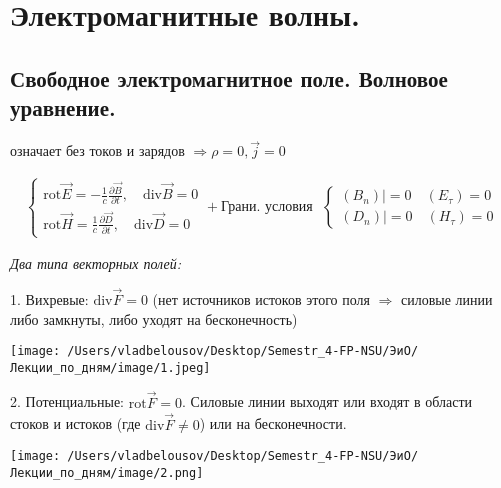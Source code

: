 \documentclass[12pt, a4paper]{report}
\begin{document}
\fi


\chapter{Электромагнитные волны.}

\section{Свободное электромагнитное поле. Волновое уравнение.  }

\begin{definition}[Свободное]   
означает без токов и зарядов \( \Rightarrow \rho =0 , \vec{j}= 0   \) 
\end{definition}

\[ 
\begin{aligned}
    \begin{cases}
         \displaystyle \mathrm{rot} \vec{ E} =-\frac{1}{c}\frac{\partial\vec{B}}{\partial t}, \quad \mathrm{div} \vec{B}=0 \\
        \displaystyle \mathrm{rot} \vec{H} =\frac{1}{c}\frac{\partial\vec{D}}{\partial t}, \quad \mathrm{div} \vec{D}=0     
    \end{cases} 
    + \text{Грани. условия} 
    \text{ } 
    \begin{cases}
        (B_n)| = 0 \quad (E_{\tau} )= 0 \\ 
        (D_n)| = 0 \quad (H_{\tau} )= 0 
    \end{cases}
\end{aligned}
 \] 

 \textit{Два типа векторных полей:} 

 1. Вихревые: \( \mathrm{div}\vec{F}= 0    \)  (нет источников истоков этого поля \( \Rightarrow  \) силовые линии либо замкнуты, либо уходят на бесконечность)

\begin{center}
    \texttt{[image: /Users/vladbelousov/Desktop/Semestr\_4-FP-NSU/ЭиО/Лекции\_по\_дням/image/1.jpeg]}
\end{center}

 2. Потенциальные: \( \mathrm{rot} \vec{F} =0 \). Силовые линии выходят или входят в области стоков и истоков (где \( \mathrm{div} \vec{F} \neq 0     \)) или на бесконечности. 

\begin{center}
    \texttt{[image: /Users/vladbelousov/Desktop/Semestr\_4-FP-NSU/ЭиО/Лекции\_по\_дням/image/2.png]}
\end{center}
\end{document}
